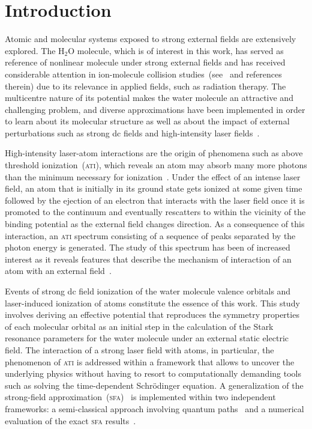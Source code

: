 \chapter{Introduction}
\label{cha:introduction}


Atomic and molecular systems exposed to strong external fields are
extensively explored. The H$_{2}$O molecule, which is of interest in
this work, has served as reference of nonlinear molecule under strong
external fields and has received considerable attention in
ion-molecule collision
studies~(see~\cite{horbatsch_2012col,illescas_2013} and references
therein) due to its relevance in applied fields, such as radiation
therapy.  The multicentre nature of its potential makes the water
molecule an attractive and challenging problem, and diverse
approximations have been implemented in order to learn about its
molecular structure as well as about the impact of external
perturbations such as strong dc fields and high-intensity laser
fields~\cite{Jagau_manybody_H2O,Toru_weakF_H2O,Krause2015_CAP_H2O,Zhao_2011_H2Otunneling,Petretti_H2O_laser}.

High-intensity laser-atom interactions are the origin of phenomena
such as above threshold ionization~(\textsc{ati}), which reveals an
atom may absorb many more photons than the minimum necessary for
ionization~\cite{ATI1979}.
Under the effect of an intense laser field, an atom that is initially
in its ground state gets ionized at some given time followed by the
ejection of an electron that interacts with the laser field once it is
promoted to the continuum and eventually rescatters to within the
vicinity of the binding potential as the external field changes
direction. As a consequence of this interaction, an \textsc{ati}
spectrum consisting of a sequence of peaks separated by the photon
energy is generated. The study of this spectrum has been of increased
interest as it reveals features that describe the mechanism of
interaction of an atom with an external
field~\cite{BeckerRescattering_2018,Becker_ati2002}.

Events of strong dc field ionization of the water molecule valence
orbitals and laser-induced ionization of atoms constitute the essence
of this work. This study involves deriving an effective potential that
reproduces the symmetry properties of each molecular orbital as an
initial step in the calculation of the Stark resonance parameters for
the water molecule under an external static electric field.
The interaction of a strong laser field with atoms, in particular, the
phenomenon of \textsc{ati} is addressed within a framework that allows
to uncover the underlying physics without having to resort to
computationally demanding tools such as solving the time-dependent
Schr\"{o}dinger equation. A generalization of the strong-field
approximation~(\textsc{sfa})~\cite{KeldyshSFA} is implemented within
two independent frameworks: a semi-classical approach involving
quantum paths~\cite{KopoldOptComm2000} and a numerical evaluation of
the exact \textsc{sfa} results~\cite{Kopold_1997sfa}.

